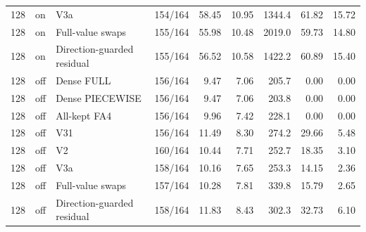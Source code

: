 \begin{tabular}{rllrrrrrr}
128 & on & V3a & 154/164 & 58.45 & 10.95 & 1344.4 & 61.82 & 15.72 \\
128 & on & Full-value swaps & 155/164 & 55.98 & 10.48 & 2019.0 & 59.73 & 14.80 \\
128 & on & Direction-guarded residual & 155/164 & 56.52 & 10.58 & 1422.2 & 60.89 & 15.40 \\
128 & off & Dense FULL & 156/164 & 9.47 & 7.06 & 205.7 & 0.00 & 0.00 \\
128 & off & Dense PIECEWISE & 156/164 & 9.47 & 7.06 & 203.8 & 0.00 & 0.00 \\
128 & off & All-kept FA4 & 156/164 & 9.96 & 7.42 & 228.1 & 0.00 & 0.00 \\
128 & off & V31 & 156/164 & 11.49 & 8.30 & 274.2 & 29.66 & 5.48 \\
128 & off & V2 & 160/164 & 10.44 & 7.71 & 252.7 & 18.35 & 3.10 \\
128 & off & V3a & 158/164 & 10.16 & 7.65 & 253.3 & 14.15 & 2.36 \\
128 & off & Full-value swaps & 157/164 & 10.28 & 7.81 & 339.8 & 15.79 & 2.65 \\
128 & off & Direction-guarded residual & 158/164 & 11.83 & 8.43 & 302.3 & 32.73 & 6.10 \\
\bottomrule
\end{tabular}

